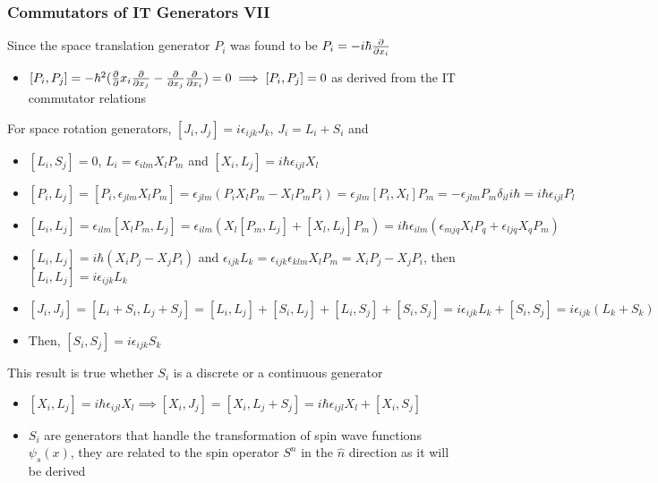 \documentclass[8pt,t,mathserif,aspectratio=169]{beamer}
\begin{document}
\begin{frame}
  \frametitle{Commutators of IT Generators VII}
  \vspace{1mm}
  Since the space translation generator $P_i$ was found to be $P_i = -i \hbar {\partial \over \partial x_i}$
  \begin{itemize}
    \item $[P_i,P_j] = - \hbar^2 ({\partial \over \partial} x_i {\partial \over \partial x_j} - {\partial \over \partial x_j} {\partial \over \partial x_i}) = 0 \implies [P_i,P_j] = 0$ as derived from the IT commutator relations
  \end{itemize}
  For space rotation generators, $[J_i,J_j] = i \epsilon_{ijk} J_k$, $J_i = L_i + S_i$ and
  \begin{itemize}
    \item $[L_i,S_j] = 0$, $L_i = \epsilon_{ilm} X_l P_m$ and $[X_i,L_j] = i \hbar \epsilon_{ijl} X_l$
    \item $[P_i,L_j] = [P_i,\epsilon_{jlm} X_l P_m] = \epsilon_{jlm} (P_i X_l P_m - X_l P_m P_i) = \epsilon_{jlm} [P_i,X_l] P_m = -\epsilon_{jlm} P_m \delta_{il} i \hbar = i \hbar \epsilon_{ijl} P_l$
    \item $[L_i,L_j] = \epsilon_{ilm} [X_l P_m,L_j] = \epsilon_{ilm} (X_l [P_m,L_j] + [X_l,L_j] P_m) = i \hbar \epsilon_{ilm} (\epsilon_{mjq} X_l P_q + \epsilon_{ljq} X_q P_m)$
    \item $[L_i,L_j] = i \hbar (X_i P_j - X_j P_i)$ and $\epsilon_{ijk} L_k = \epsilon_{ijk} \epsilon_{klm} X_l P_m = X_i P_j - X_j P_i$, then $[L_i,L_j] = i \epsilon_{ijk} L_k$
    \item $[J_i,J_j] = [L_i + S_i,L_j + S_j] = [L_i,L_j] + [S_i,L_j] + [L_i,S_j] + [S_i,S_j] = i \epsilon_{ijk} L_k + [S_i,S_j] = i \epsilon_{ijk} (L_k + S_k)$
    \item Then, $[S_i,S_j] = i \epsilon_{ijk} S_k$
  \end{itemize}
  This result is true whether $S_i$ is a discrete or a continuous generator
  \begin{itemize}
    \item $[X_i,L_j] = i \hbar \epsilon_{ijl} X_l \implies [X_i,J_j] = [X_i,L_j + S_j] = i \hbar \epsilon_{ijl} X_l + [X_i,S_j]$
    \item $S_i$ are generators that handle the transformation of spin wave functions $\psi_s(x)$, they are related to the spin operator $S^n$ in the $\hat{n}$ direction as it will be derived
  \end{itemize}
\end{frame}
\end{document}
